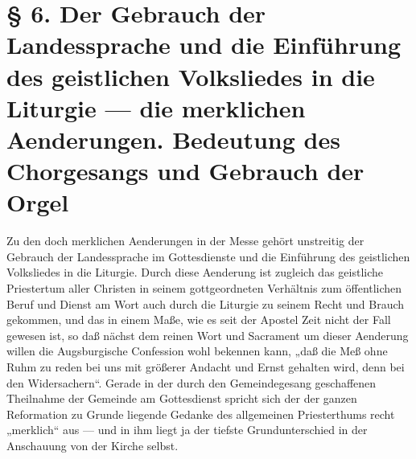 \chapter[§ 6. Der Gebrauch der Landessprache]{§ 6. Der Gebrauch der Landessprache und die Einführung des geistlichen Volksliedes in die Liturgie — die merklichen Aenderungen. Bedeutung des Chorgesangs und Gebrauch der Orgel}


Zu den doch merklichen Aenderungen in der Messe gehört unstreitig der Gebrauch der Landessprache im Gottesdienste und die Einführung des geistlichen Volksliedes in die Liturgie. Durch diese Aenderung ist zugleich das geistliche Priestertum aller Christen in seinem gottgeordneten Verhältnis zum öffentlichen Beruf und Dienst am Wort auch durch die Liturgie zu seinem Recht und Brauch gekommen, und das in einem Maße, wie es seit der Apostel Zeit nicht der Fall gewesen ist, so daß nächst dem reinen Wort und Sacrament um dieser Aenderung willen die Augsburgische Confession wohl bekennen kann, „daß die Meß ohne Ruhm zu reden bei uns mit größerer Andacht und Ernst gehalten wird, denn bei den Widersachern“. Gerade in der durch den Gemeindegesang geschaffenen Theilnahme der Gemeinde am Gottesdienst spricht sich der der ganzen Reformation zu Grunde liegende Gedanke des allgemeinen Priesterthums recht „merklich“ aus — und in ihm liegt ja der tiefste Grundunterschied in der Anschauung von der Kirche selbst.

